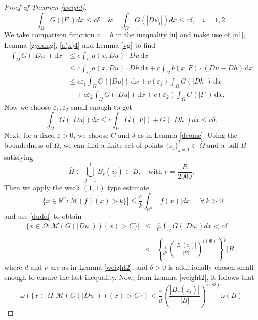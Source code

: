 \documentclass[10pt,a4paper]{article}
\theoremstyle{definition}
\numberwithin{equation}{section}
\newcommand{\ls}{\leqslant}
\begin{document}
\begin{proof}[Proof of Theorem \ref{weight}]
\begin{equation*}
\int_{\Omega }G(|F|)dx \ls c \delta \ \ \ \ \  \& \ \ \ \ \  \int_{\Omega }G(|D\psi_i|)dx \ls c \delta, \quad i=1,2.
\end{equation*}
We take comparison function $v=h$ in the inequality \eqref{u} and make use of  \eqref{u1}, Lemma \ref{gyoung}, \eqref{a(x)4} and Lemma \ref{vg} to find
\begin{align*}
	\int_{\Omega} G(|Du|)\,\mathrm{d}x
	&\leq c\int_{\Omega}a(x,Du)\cdot Du\,\mathrm{d}x
	\nonumber\\
	&\leq c\int_{\Omega}a(x,Du)\cdot Dh\,\mathrm{d}x
	+c\int_{\Omega}b(x,F)\cdot(Du-Dh)\,\mathrm{d}x
	\nonumber\\
	&\leq c\varepsilon_1\int_{\Omega}G(|Du|)\,\mathrm{d}x
	+c(\varepsilon_1)\int_{\Omega}G(|Dh|)\,\mathrm{d}x
	\nonumber\\
	&\quad
	+c\varepsilon_2\int_{\Omega}G(|Du|)\,\mathrm{d}x
	+c(\varepsilon_2)\int_{\Omega}G(|F|)\,\mathrm{d}x.
	\label{energy-estimate}
\end{align*}
Now we choose $\varepsilon_1, \varepsilon_2$ small enough to get
\begin{equation}\label{dudel}
\int_{\Omega} G(|Du|)dx \ls c\int_{\Omega} G(|F|)+G(|Dh|)dx \ls c \delta.
\end{equation}
{
Next, for a fixed \( \varepsilon > 0 \), we choose \( C \) and \( \delta \) as in Lemma \ref{deome}. Using the boundedness of \( \Omega \), we can find a finite set of points \(\{z_j\}_{j=1}^l \subset \bar{\Omega}\) and a ball \( B \) satisfying
\[
\bar{\Omega} \subset \bigcup_{j=1}^l B_r(z_j) \subset B, \quad \text{with } r = \frac{R}{2000}.
\]
Then we apply the weak $(1,1)$ type estimate
\[
|\{x \in \mathbb{R}^n : \mathcal{M}(f)(x) > k\}| \leq \frac{c}{k} \int_{\mathbb{R}^n} |f(x)| dx,
\quad\forall\, k > 0
\]
and use \eqref{dudel} to obtain 
\begin{eqnarray*}
|\{x \in \Omega : \mathcal{M}(G(|Du|))(x) > C\}| &\leq& \frac{c}{C} \int_{\Omega} G(|Du|) dx< c\delta \\
&<& \left\{ \frac{\varepsilon}{d^2} \left( \frac{|B_r(z_j)|}{|B|} \right)^{i(\Phi)} \right\}^{\frac{1}{\nu}} |B|,
\end{eqnarray*}
where \( d \) and \( \nu \) are as in Lemma \ref{weight2}, and \( \delta > 0 \) is additionally chosen small enough to ensure the last inequality.  Now, from Lemma \ref{weight2},
it follows that
\begin{equation*}
\omega(\{x \in \Omega : \mathcal{M}(G(|Du|))(x) > C\}) < \frac{\varepsilon}{d} \left( \frac{|B_r(z_j)|}{|B|} \right)^{i(\Phi)} \omega(B)
\end{equation*}
}
\end{proof}
\end{document}
